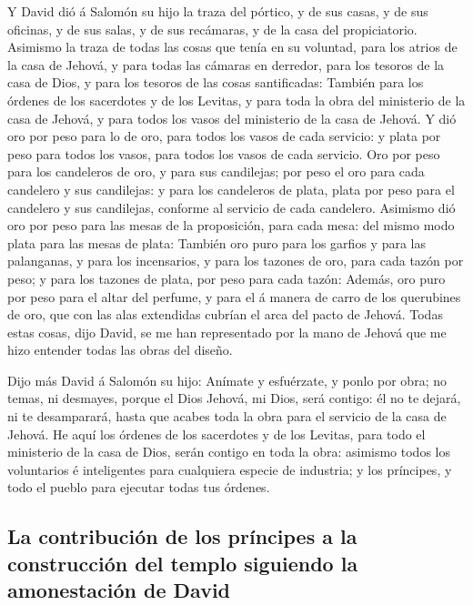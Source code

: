  Y David dió á Salomón su hijo la traza del pórtico, y de
sus casas, y de sus oficinas, y de sus salas, y de sus recámaras, y de
la casa del propiciatorio.  Asimismo la traza de todas
las cosas que tenía en su voluntad, para los atrios de la casa de
Jehová, y para todas las cámaras en derredor, para los tesoros de la
casa de Dios, y para los tesoros de las cosas santificadas:
 También para los órdenes de los sacerdotes y de los
Levitas, y para toda la obra del ministerio de la casa de Jehová, y para
todos los vasos del ministerio de la casa de Jehová.  Y
dió oro por peso para lo de oro, para todos los vasos de cada servicio:
y plata por peso para todos los vasos, para todos los vasos de cada
servicio.  Oro por peso para los candeleros de oro, y
para sus candilejas; por peso el oro para cada candelero y sus
candilejas: y para los candeleros de plata, plata por peso para el
candelero y sus candilejas, conforme al servicio de cada candelero.
 Asimismo dió oro por peso para las mesas de la
proposición, para cada mesa: del mismo modo plata para las mesas de
plata:  También oro puro para los garfios y para las
palanganas, y para los incensarios, y para los tazones de oro, para cada
tazón por peso; y para los tazones de plata, por peso para cada tazón:
 Además, oro puro por peso para el altar del perfume, y
para el á manera de carro de los querubines de oro, que con las alas
extendidas cubrían el arca del pacto de Jehová.  Todas
estas cosas, dijo David, se me han representado por la mano de Jehová
que me hizo entender todas las obras del diseño.

 Dijo más David á Salomón su hijo: Anímate y esfuérzate,
y ponlo por obra; no temas, ni desmayes, porque el Dios Jehová, mi Dios,
será contigo: él no te dejará, ni te desamparará, hasta que acabes toda
la obra para el servicio de la casa de Jehová.  He aquí
los órdenes de los sacerdotes y de los Levitas, para todo el ministerio
de la casa de Dios, serán contigo en toda la obra: asimismo todos los
voluntarios é inteligentes para cualquiera especie de industria; y los
príncipes, y todo el pueblo para ejecutar todas tus órdenes.

\hypertarget{la-contribuciuxf3n-de-los-pruxedncipes-a-la-construcciuxf3n-del-templo-siguiendo-la-amonestaciuxf3n-de-david}{%
\subsection{La contribución de los príncipes a la construcción del
templo siguiendo la amonestación de
David}\label{la-contribuciuxf3n-de-los-pruxedncipes-a-la-construcciuxf3n-del-templo-siguiendo-la-amonestaciuxf3n-de-david}}

